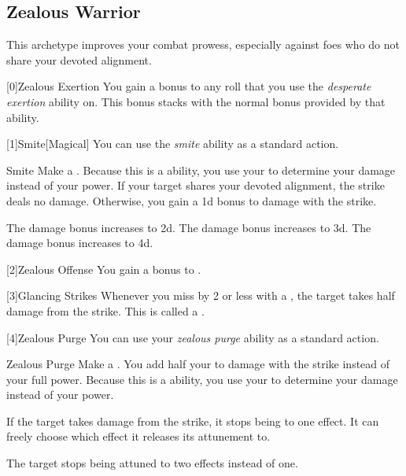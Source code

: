    \newpage
    \subsection{Zealous Warrior}
        This archetype improves your combat prowess, especially against foes who do not share your devoted alignment.

        [0]{Zealous Exertion} You gain a  bonus to any roll that you use the \textit{desperate exertion} ability on.
        This bonus stacks with the normal  bonus provided by that ability.

        [1]{Smite}[Magical] You can use the \textit{smite} ability as a standard action.
        \begin{freeability}{Smite}
            Make a .
            Because this is a  ability, you use your   to determine your damage instead of your  power.
            If your target shares your devoted alignment, the strike deals no damage.
            Otherwise, you gain a \plus1d bonus to damage with the strike.

            \rankline
             The damage bonus increases to \plus2d.
             The damage bonus increases to \plus3d.
             The damage bonus increases to \plus4d.
        \end{freeability}

        [2]{Zealous Offense} You gain a  bonus to .

        [3]{Glancing Strikes} Whenever you miss by 2 or less with a , the target takes half damage from the strike.
        This is called a .

        [4]{Zealous Purge} You can use your \textit{zealous purge} ability as a standard action.
        \begin{freeability}{Zealous Purge}
            Make a .
            You add half your  to damage with the strike instead of your full power.
            Because this is a  ability, you use your   to determine your damage instead of your  power.

            If the target takes damage from the strike, it stops being  to one effect.
            It can freely choose which effect it releases its attunement to.

            \rankline
             The target stops being attuned to two effects instead of one.
        \end{freeability}

